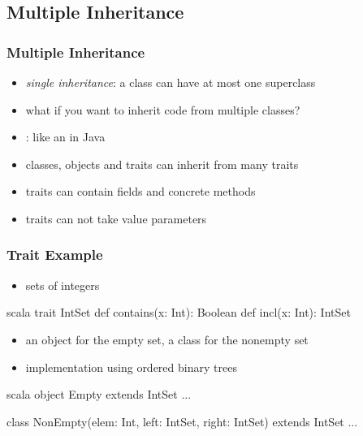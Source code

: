 \documentclass[dvipsnames]{beamer}
\theoremstyle{plain}
\begin{document}
\subsection{Multiple Inheritance}

\begin{frame}
  \frametitle{Multiple Inheritance}

  \begin{itemize}
    \item \emph{single inheritance}: a class can have at most one superclass
    \item what if you want to inherit code from multiple classes?

    \pause
    \medskip
    \item {}: like an  in Java
    \item classes, objects and traits can inherit from many traits
    \item traits can contain fields and concrete methods
    \item traits can not take value parameters
  \end{itemize}
\end{frame}

\begin{frame}[fragile]
  \frametitle{Trait Example}

  \begin{example}[Scala]
    \begin{itemize}
      \item sets of integers
    \end{itemize}

    \begin{pygments}{scala}
trait IntSet {
    def contains(x: Int): Boolean
    def incl(x: Int): IntSet
}
    \end{pygments}

    \pause
    \begin{itemize}
      \item an object for the empty set, a class for the nonempty set
      \item implementation using ordered binary trees
    \end{itemize}

    \begin{pygments}{scala}
object Empty extends IntSet ...

class NonEmpty(elem: Int, left: IntSet,
               right: IntSet) extends IntSet ...
    \end{pygments}
  \end{example}
\end{frame}
\end{document}
